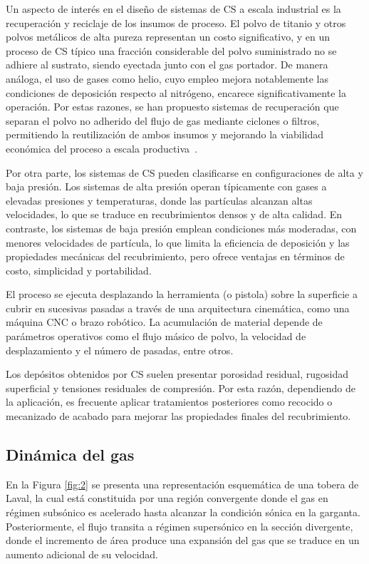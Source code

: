 Un aspecto de interés en el diseño de sistemas de CS a escala industrial es la recuperación y reciclaje de los insumos de proceso. El polvo de titanio y otros 
polvos metálicos de alta pureza representan un costo significativo, y en un 
proceso de CS típico una fracción considerable del polvo suministrado no se 
adhiere al sustrato, siendo eyectada junto con el gas portador. De manera 
análoga, el uso de gases como helio, cuyo empleo mejora notablemente las 
condiciones de deposición respecto al nitrógeno, encarece significativamente la operación. Por estas razones, se han propuesto sistemas de recuperación que separan el polvo no adherido del flujo 
de gas mediante ciclones o filtros, permitiendo la reutilización de ambos 
insumos y mejorando la viabilidad económica del proceso a escala 
productiva~\cite{Legoux2010}.

Por otra parte, los sistemas de CS pueden clasificarse en configuraciones de alta y baja presión. Los sistemas de alta presión operan típicamente con gases a elevadas presiones y temperaturas, donde las partículas alcanzan altas velocidades, lo que se traduce en recubrimientos densos y de alta calidad. En contraste, los sistemas de baja presión emplean condiciones más moderadas, con menores velocidades de partícula, lo que limita la eficiencia de deposición y las propiedades mecánicas del recubrimiento, pero ofrece ventajas en términos de costo, simplicidad y portabilidad.

El proceso se ejecuta desplazando la herramienta (o pistola) sobre la superficie a cubrir en sucesivas pasadas a través de una arquitectura cinemática, como una máquina CNC o brazo robótico. La acumulación de material depende de parámetros operativos como el flujo másico de polvo, la velocidad de desplazamiento y el número de pasadas, entre otros.

Los depósitos obtenidos por CS suelen presentar porosidad residual, 
rugosidad superficial y tensiones residuales de compresión. Por esta razón, dependiendo de la aplicación, es frecuente aplicar tratamientos posteriores como recocido o mecanizado de acabado para mejorar las propiedades finales del recubrimiento.
 
\subsection{Dinámica del gas}

En la Figura \ref{fig:2} se presenta una representación esquemática de una tobera de Laval, la cual está constituida por una región convergente donde el gas en régimen subsónico es acelerado hasta alcanzar la condición sónica en la garganta. Posteriormente, el flujo transita a régimen supersónico en la sección divergente, donde el incremento de área produce una expansión del gas que se traduce en un aumento adicional de su velocidad.

